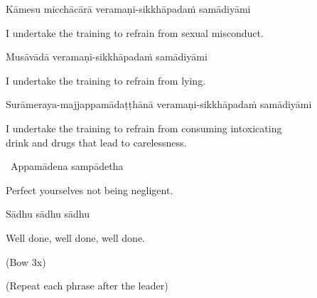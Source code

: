 Kāmesu micchācārā veramaṇi-sikkhāpadaṁ samādiyāmi

\begin{english}
  I undertake the training to refrain from sexual misconduct.
\end{english}

Musāvādā veramaṇi-sikkhāpadaṁ samādiyāmi

\begin{english}
  I undertake the training to refrain from lying.
\end{english}

\begin{pali-hang}
  Surāmeraya-majjappamādaṭṭhānā veramaṇi-sikkhāpadaṁ samādiyāmi
\end{pali-hang}

\begin{english-hang}
  I undertake the training to refrain from consuming intoxicating\\
  drink and drugs that lead to carelessness.\hyperlink{endnote140-appendix}{\hypertarget{endnote140-body}{}}
\end{english-hang}


\begin{leader-only}
  \anglebracketleft\ \hspace{-0.5mm}Appamādena sampādetha \hspace{-0.5mm}\anglebracketright\
\end{leader-only}

\begin{english}
  Perfect yourselves not being negligent.
\end{english}

Sādhu sādhu sādhu

\begin{english}
  Well done, well done, well done.
\end{english}

\begin{center}
  (Bow 3x)
\end{center}

\clearpage

\begin{center}
  \textbf{}
\end{center}

\begin{center}
  (Repeat each phrase after the leader)
\end{center}

